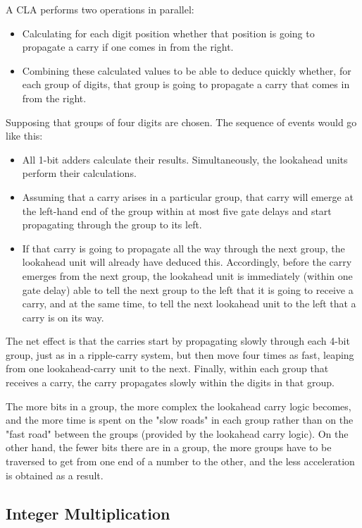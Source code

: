 A CLA performs two operations in parallel:
\begin{itemize}
    \item Calculating for each digit position whether that position is going to propagate a carry if one comes in from the right.
    \item Combining these calculated values to be able to deduce quickly whether, for each group of digits, that group is going
          to propagate a carry that comes in from the right.
\end{itemize}
Supposing that groups of four digits are chosen. The sequence of events would go like this:
\begin{itemize}
    \item All 1-bit adders calculate their results. Simultaneously, the lookahead units perform their calculations.
    \item Assuming that a carry arises in a particular group, that carry will emerge at the left-hand end of the
          group within at most five gate delays and start propagating through the group to its left.
    \item If that carry is going to propagate all the way through the next group, the lookahead unit will already
          have deduced this. Accordingly, before the carry emerges from the next group, the lookahead unit is immediately
          (within one gate delay) able to tell the next group to the left that it is going to receive a carry, and at
          the same time, to tell the next lookahead unit to the left that a carry is on its way.
\end{itemize}
The net effect is that the carries start by propagating slowly through each 4-bit group, just as in a ripple-carry system,
but then move four times as fast, leaping from one lookahead-carry unit to the next. Finally, within each group that
receives a carry, the carry propagates slowly within the digits in that group.

The more bits in a group, the more complex the lookahead carry logic becomes, and the more time is spent on the "slow roads"
in each group rather than on the "fast road" between the groups (provided by the lookahead carry logic). On the other hand,
the fewer bits there are in a group, the more groups have to be traversed to get from one end of a number to the other, and
the less acceleration is obtained as a result.

\subsection{Integer Multiplication}

